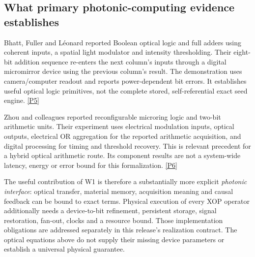 \subsection{What primary photonic-computing evidence establishes}

Bhatt, Fuller and L\'eonard reported Boolean optical logic and full adders
using coherent inputs, a spatial light modulator and intensity thresholding.
Their eight-bit addition sequence re-enters the next column's inputs through
a digital micromirror device using the previous column's result. The
demonstration uses camera/computer readout and reports power-dependent bit
errors. It establishes useful optical logic primitives, not the complete
stored, self-referential exact seed engine.
\href{https://www.nature.com/articles/s41467-026-74970-5}{[P5]}

Zhou and colleagues reported reconfigurable microring logic and two-bit
arithmetic units. Their experiment uses electrical modulation inputs, optical
outputs, electrical OR aggregation for the reported arithmetic acquisition,
and digital processing for timing and threshold recovery. This is relevant
precedent for a hybrid optical arithmetic route. Its component results are
not a system-wide latency, energy or error bound for this formalization.
\href{https://www.nature.com/articles/s41467-026-75750-x}{[P6]}

The useful contribution of W1 is therefore a substantially more explicit
\emph{photonic interface}: optical transfer, material memory, acquisition
meaning and causal feedback can be bound to exact terms. Physical execution
of every XOP operator additionally needs a device-to-bit refinement,
persistent storage, signal restoration, fan-out, clocks and a resource bound.
Those implementation obligations are addressed separately in this release's
realization contract. The optical equations above do not supply their missing
device parameters or establish a universal physical guarantee.
